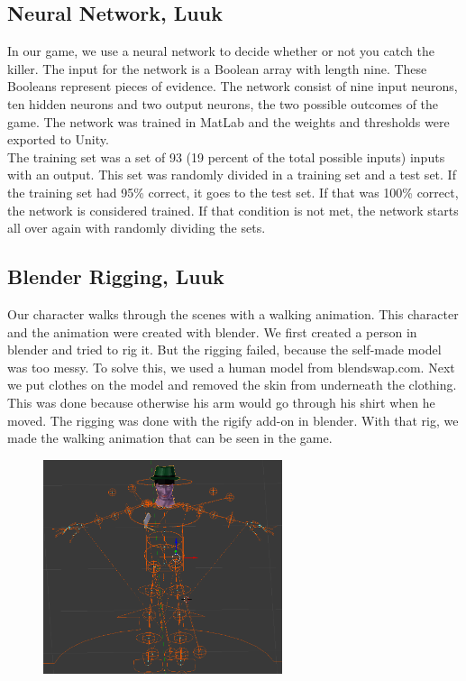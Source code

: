 \documentclass{article}
\begin{document}
\subsection{Neural Network, Luuk}
In our game, we use a neural network to decide whether or not you catch the killer. The input for the network is a Boolean array with length nine. These Booleans represent pieces of evidence. The network consist of nine input neurons, ten hidden neurons and two output neurons, the two possible outcomes of the game. The network was trained in MatLab and the weights and thresholds were exported to Unity.\\
The training set was a set of 93 (19 percent of the total possible inputs) inputs with an output. This set was randomly divided in a training set and a test set. If the training set had 95\% correct, it goes to the test set. If that was 100\% correct, the network is considered trained. If that condition is not met, the network starts all over again with randomly dividing the sets. 

\subsection{Blender Rigging, Luuk}
Our character walks through the scenes with a walking animation. This character and the animation were created with blender. We first created a person in blender and tried to rig it. But the rigging failed, because the self-made model was too messy. To solve this, we used a human model from blendswap.com. Next we put clothes on the model and removed the skin from underneath the clothing. This was done because otherwise his arm would go through his shirt when he moved. The rigging was done with the rigify add-on in blender. With that rig, we made the walking animation that can be seen in the game.

	\begin{figure}[ht!]
		\centering
		\includegraphics[width=70mm]{images/Rigging.png}
	\end{figure}
\end{document}
